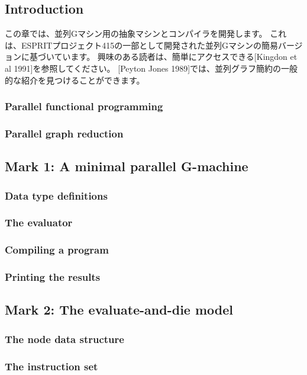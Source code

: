\documentclass{jarticle}
\begin{document}
\subsection{Introduction}

この章では、並列Gマシン用の抽象マシンとコンパイラを開発します。
これは、ESPRITプロジェクト415の一部として開発された並列Gマシンの簡易バージョンに基づいています。
興味のある読者は、簡単にアクセスできる[Kingdon et al 1991]を参照してください。
[Peyton Jones 1989]では、並列グラフ簡約の一般的な紹介を見つけることができます。

\subsubsection{Parallel functional programming}
\subsubsection{Parallel graph reduction}
\newpage

\subsection{Mark 1: A minimal parallel G-machine}
\subsubsection{Data type definitions}
\subsubsection{The evaluator}
\subsubsection{Compiling a program}
\subsubsection{Printing the results}
\newpage

\subsection{Mark 2: The evaluate-and-die model}
\subsubsection{The node data structure}
\subsubsection{The instruction set}
\newpage
\end{document}
